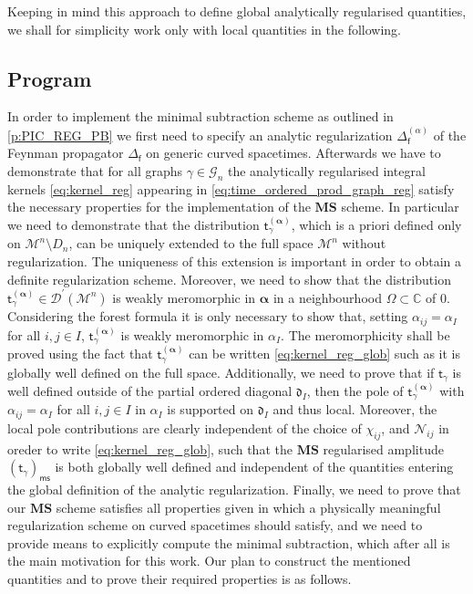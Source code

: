 \documentclass[12pt]{book}
\newcommand{\ms}{\mathsf{ms}}
\newcommand{\MS}{\textbf{MS}}
\newcommand{\Dcal}{\mathcal{D}}
\newcommand{\Gcal}{\mathcal{G}}
\newcommand{\Mcal}{\mathcal{M}}
\newcommand{\Ncal}{\mathcal{N}}
\newcommand{\Cbb}{\mathbb{C}}
\newcommand{\drak}{\mathfrak{d}}
\newcommand{\fsf}{\mathsf{f}}
\newcommand{\tsf}{\mathsf{t}}
\theoremstyle{break}
\begin{document}
Keeping in mind this approach to define global analytically regularised quantities, we shall for simplicity work only with local quantities in the following.


\subsection{Program} \label{p:PROGRAM}


In order to implement the minimal subtraction scheme as outlined in \ref{p:PIC_REG_PB} we first need to specify an analytic regularization $\Delta^{(\alpha)}_\fsf$ of the Feynman propagator $\Delta_\fsf$ on generic curved spacetimes. %
%
Afterwards we have to demonstrate that for all graphs $\gamma\in\Gcal_n$ the analytically regularised integral kernels \eqref{eq:kernel_reg} appearing in \eqref{eq:time_ordered_prod_graph_reg} satisfy the necessary properties for the implementation of the $\MS$ scheme. %
%
In particular we need to demonstrate that the distribution $\tsf^{(\boldsymbol{\alpha})}_\gamma$, which is a priori defined only on $\Mcal^n\setminus D_n$, can be uniquely extended to the full space $\Mcal^n$ without regularization. The uniqueness of this extension is important in order to obtain a definite regularization scheme. %
%
Moreover, we need to show that the distribution $\tsf^{(\boldsymbol{\alpha})}_\gamma\in\Dcal^\prime(\Mcal^n)$ is weakly meromorphic in $\boldsymbol{\alpha}$ in a neighbourhood $\Omega \subset \Cbb$ of 0. Considering the forest formula it is only necessary to show that, setting $\alpha_{ij} = \alpha_I$ for all $i,j\in I$, $\tsf^{(\boldsymbol{\alpha})}_\gamma$ is weakly meromorphic in $\alpha_I$. The meromorphicity shall be proved using the fact that $\tsf^{(\boldsymbol{\alpha})}_\gamma$ can be written \eqref{eq:kernel_reg_glob} such as it is globally well defined on the full space. %
%
Additionally, we need to prove that if $\tsf_\gamma$ is well defined outside of the partial ordered diagonal $\drak_I$, then the pole of $\tsf^{(\boldsymbol{\alpha})}_\gamma$ with $\alpha_{ij}=\alpha_I$ for all $i,j\in I$ in $\alpha_I$ is supported on $\drak_I$ and thus local. Moreover, the local pole contributions are clearly independent of the choice of $\chi_{ij}$, and $\Ncal_{ij}$ in oreder to write \ref{eq:kernel_reg_glob}, such that the $\MS$ regularised amplitude $(\tsf_\gamma)_\ms$ is both globally well defined and independent of the quantities entering the global definition of the analytic regularization. %
%
Finally, we need to prove that our $\MS$ scheme satisfies all properties given in \cite{hollands_local_2001,hollands_existence_2002} which a physically meaningful regularization scheme on curved spacetimes should satisfy, and we need to provide means to explicitly compute the minimal subtraction, which after all is the main motivation for this work. %
%
Our plan to construct the mentioned quantities and to prove their required properties is as follows.
\end{document}
